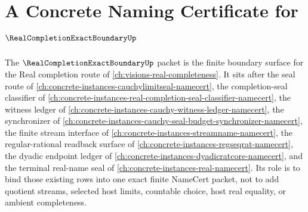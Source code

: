 \chapter{A Concrete Naming Certificate for $\RealCompletionExactBoundaryUp$}
\label{ch:concrete-instances-real-completion-exact-boundary-namecert}

The $\RealCompletionExactBoundaryUp$ packet is the finite boundary surface for the Real completion route of \autoref{ch:visions-real-completeness}. It sits after the seal route of \autoref{ch:concrete-instances-cauchylimitseal-namecert}, the completion-seal classifier of \autoref{ch:concrete-instances-real-completion-seal-classifier-namecert}, the witness ledger of \autoref{ch:concrete-instances-cauchy-witness-ledger-namecert}, the synchronizer of \autoref{ch:concrete-instances-cauchy-seal-budget-synchronizer-namecert}, the finite stream interface of \autoref{ch:concrete-instances-streamname-namecert}, the regular-rational readback surface of \autoref{ch:concrete-instances-regseqrat-namecert}, the dyadic endpoint ledger of \autoref{ch:concrete-instances-dyadicratcore-namecert}, and the terminal real-name seal of \autoref{ch:concrete-instances-real-namecert}. Its role is to bind those existing rows into one exact finite NameCert packet, not to add quotient streams, selected host limits, countable choice, host real equality, or ambient completeness.



